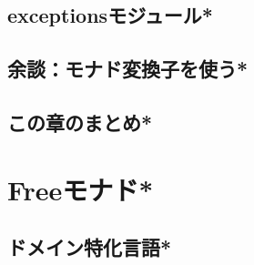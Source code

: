\documentclass[a5paper,twoside,fleqn,draft]{jsbook}
\begin{document}
\section{exceptionsモジュール*}
\section{余談：モナド変換子を使う*}
\section{この章のまとめ*}




\chapter{Freeモナド*}
\section{ドメイン特化言語*}
\end{document}
